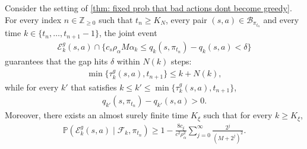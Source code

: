 \vspace{-0.4cm}

\begin{lemma}
\label{thm: from a_k margin to delta}
Consider the setting of \autoref{thm: fixed prob that bad actions dont become greedy}.
For every index $n \in \mathbb Z_{\ge 0}$ such that $t_n \ge K_N$,
every pair $(s,a) \in \mathcal B_{\pi_{t_n}}$
and every time $k \in \{t_n, \dots, t_{n+1}-1\}$,
the joint event
\begin{align}
\label{eq: joint growth event}
\mathcal E^g_k(s,a) \cap \big\{ c_s \rho_\alpha M \alpha_k \leq q_{k}(s,\pi_{t_n}) - q_{k}(s,a) < \delta \big\}
\end{align}
guarantees that the gap hits $\delta$ within $N(k)$ steps:
\begin{align}
\label{eq: hit time event a_k to delta}
    \min\{ \tau^g_k(s,a) , t_{n+1} \} \le k + N(k) ,
\end{align}
while for every $k'$ that satisfies 
$k \le k' \le \min\{ \tau^g_k(s,a), t_{n+1} \}$,
\begin{align}
\label{eq: growth event gap remains positive}
    q_{k'}(s,\pi_{t_n}) - q_{k'}(s,a) > 0 .
\end{align}
Moreover, there exists an almost surely finite time $K_\xi$ such that for every $k \ge K_\xi$,
\begin{align}
\label{eq: prob from a_k reach delta}
    \mathbb P (\mathcal E^g_k(s,a) \mid \mathcal F_k, \pi_{t_n})
    \ge 1 - \frac{8 c_\xi}{c^2 \rho_\alpha^2} \sum_{j = 0}^{\infty} \frac{2^j}{(M + 2^j)^2} .
\end{align}
\end{lemma}
